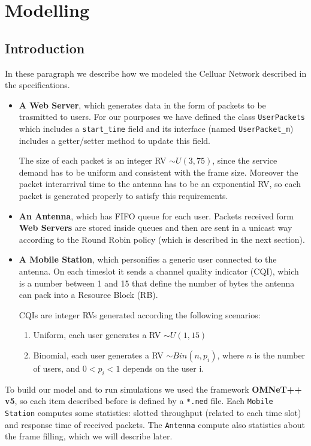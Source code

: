 \chapter{Modelling}
\section{Introduction}
In these paragraph we describe how we modeled the Celluar Network described in the specifications.
\begin{itemize}
   \item \textbf{A Web Server}, which generates data in the form of packets to be trasmitted to users. For our pourposes we have defined the class \texttt{UserPackets} which includes a \texttt{start\_time} field and its interface (named \texttt{UserPacket\_m}) includes a getter/setter method to update this field.
   
   The size of each packet is an integer RV \(\sim U(3,75)\), since the service demand has to be uniform and consistent with the frame size. Moreover the packet interarrival time to the antenna has to be an exponential RV, so each packet is generated properly to satisfy this requirements.

   \item \textbf{An Antenna}, which has FIFO queue for each user. Packets received form \textbf{Web Servers} are stored inside queues and then are sent in a unicast way according to the Round Robin policy (which is described in the next section). 
   
   \item \textbf{A Mobile Station}, which personifies a generic user connected to the antenna. On each timeslot it sends a channel quality indicator (CQI), which is a number between 1 and 15 that define the number of bytes the antenna can pack into a Resource Block (RB).
   
   CQIs are integer RVs generated according the following scenarios:
   
   \begin{enumerate} 
    \item Uniform, each user generates a RV \(\sim U(1,15)\)
    \item Binomial, each user generates a RV \(\sim Bin(n,p_i)\), where \(n\) is the number of users, and \( 0<p_i<1\) depends on the user i.
    \end{enumerate} 
\end{itemize}
To build our model and to run simulations we used the framework \textbf{OMNeT++ v5}, so each item described before is defined by a \texttt{*.ned} file.
Each \texttt{Mobile Station} computes some statistics: slotted throughput (related to each time slot) and response time of received packets. The \texttt{Antenna} compute also statistics about the frame filling, which we will describe later.

